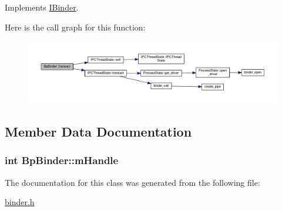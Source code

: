 Implements \hyperlink{classIBinder_aecaee0fd230aab5cea5b28e0fc88f426}{I\-Binder}.



Here is the call graph for this function\-:
\nopagebreak
\begin{figure}[H]
\begin{center}
\leavevmode
\includegraphics[width=350pt]{classBpBinder_a55c5d2af946bce92156a921a6a94a23d_cgraph}
\end{center}
\end{figure}




\subsection{Member Data Documentation}
\hypertarget{classBpBinder_adab057f2c49454e85f48209499884bd3}{
\subsubsection[{m\-Handle}]{\setlength{\rightskip}{0pt plus 5cm}int Bp\-Binder\-::m\-Handle\hspace{0.3cm}{\ttfamily [private]}}}\label{classBpBinder_adab057f2c49454e85f48209499884bd3}


The documentation for this class was generated from the following file\-:\begin{DoxyCompactItemize}
\item 
\hyperlink{binder_8h}{binder.\-h}\end{DoxyCompactItemize}
